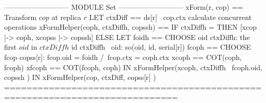 \documentclass[preview, border={5pt 0pt 32pt 1pt}]{standalone}
\begin{document}
\begin{tla}
--------------------------- MODULE Set ---------------------------
xForm(r, cop) == \* Transform $cop$ at replica $r$
    LET ctxDiff == ds[r] \ cop.ctx \* calculate concurrent operations
        xFormHelper(coph, ctxDiffh, copssh) ==
            IF ctxDiffh = {} THEN [xcop |-> coph, xcopss |-> copssh]
            ELSE LET foidh == CHOOSE oid \in ctxDiffh: \* the first $oid$ in $ctxDiffh$ 
                                \A id \in ctxDiffh \ {oid}: so(oid, id, serial[r]) 
                     fcoph == CHOOSE fcop \in copss[r]: 
                                fcop.oid = foidh /\ fcop.ctx = coph.ctx
                     xcoph == COT(coph, fcoph)    xfcoph == COT(fcoph, coph)
                 IN  xFormHelper(xcoph, ctxDiffh \ {fcoph.oid}, 
                                        copssh )
    IN  xFormHelper(cop, ctxDiff, copss[r] ) 
=============================================================================
\end{tla}
\begin{tlatex}
\@x{}\moduleLeftDash{}\moduleRightDash\@xx{}%
%
%
\@xx{}%
%
\@xx{}%
%
%
\@xx{}%
%
%
\@x{}\bottombar\@xx{}%
\end{tlatex}
\end{document}
